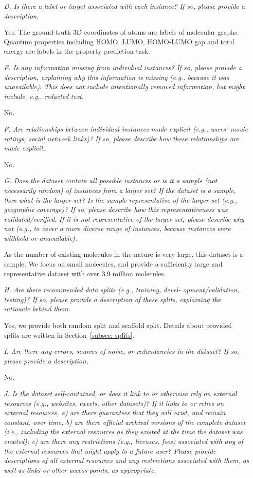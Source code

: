 \documentclass{article}
\begin{document}
\textit{D. Is there a label or target associated with each instance? If so, please provide a description.}

Yes. The ground-truth 3D coordinates of atoms are labels of molecular graphs. Quantum properties including HOMO, LUMO, HOMO-LUMO gap and total energy are labels in the property prediction task.

\textit{E. Is any information missing from individual instances? If so, please provide a description, explaining why this information is missing (e.g., because it was unavailable). This does not include intentionally removed information, but might include, e.g., redacted text.}

No.

\textit{F. Are relationships between individual instances made explicit (e.g., users’ movie ratings, social network links)? If so, please describe how these relationships are made explicit.}

No.

\textit{G. Does the dataset contain all possible instances or is it a sample (not necessarily random) of instances from a larger set? If the dataset is a sample, then what is the larger set? Is the sample representative of the larger set (e.g., geographic coverage)? If so, please describe how this representativeness was validated/verified. If it is not representative of the larger set, please describe why not (e.g., to cover a more diverse range of instances, because instances were withheld or unavailable).}

As the number of existing molecules in the nature is very large, this dataset is a sample. We focus on small molecules, and provide a sufficiently large and representative dataset with over 3.9 million molecules.

\textit{H. Are there recommended data splits (e.g., training, devel- opment/validation, testing)? If so, please provide a description of these splits, explaining the rationale behind them.}

Yes, we provide both random split and scaffold split. Details about provided splits are written in Section~\ref{subsec: splits}.

\textit{I. Are there any errors, sources of noise, or redundancies in the dataset? If so, please provide a description.}

No.

\textit{J. Is the dataset self-contained, or does it link to or otherwise rely on external resources (e.g., websites, tweets, other datasets)? If it links to or relies on external resources, a) are there guarantees that they will exist, and remain constant, over time; b) are there official archival versions of the complete dataset (i.e., including the external resources as they existed at the time the dataset was created); c) are there any restrictions (e.g., licenses, fees) associated with any of the external resources that might apply to a future user? Please provide descriptions of all external resources and any restrictions associated with them, as well as links or other access points, as appropriate.}
\end{document}
